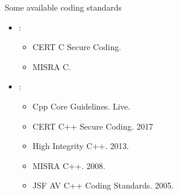 \begin{frame}[t]{Some available coding standards}
\begin{itemize}
  \item {}:
    \begin{itemize}
      \item CERT C Secure Coding.
      \item MISRA C.
    \end{itemize}

  \item {}:
    \begin{itemize}
      \item Cpp Core Guidelines. Live.
      \item CERT C++ Secure Coding. 2017
      \item High Integrity C++. 2013.
      \item MISRA C++. 2008.
      \item JSF AV C++ Coding Standards. 2005.
    \end{itemize}
\end{itemize}
\end{frame}




